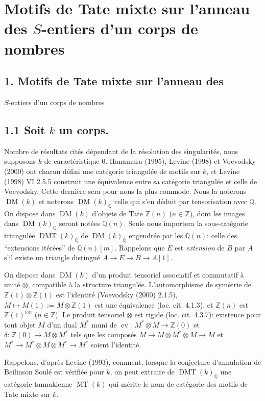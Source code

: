 \documentclass[11pt,a4paper]{article}
\theoremstyle{plain}
\theoremstyle{definition}
\theoremstyle{remark}
\DeclareMathOperator{\MT}{MT}
\DeclareMathOperator{\DM}{DM}
\DeclareMathOperator{\DMT}{DMT}
\DeclareMathOperator{\ev}{ev}
\newcommand{\dbQ}{\mathbb{Q}}
\newcommand{\dbZ}{\mathbb{Z}}
\begin{document}
\section{Motifs de Tate mixte sur l'anneau des $S$-entiers d'un corps de nombres}


\clearpage


\subsection*{1. Motifs de Tate mixte sur l'anneau des}
$S$-entiers d'un corps de nombres


\subsection*{1.1 Soit $k$ un corps.}
Nombre de r\'esultats cit\'es d\'ependant de
la r\'esolution des singularit\'es, nous
supposons $k$ de caract\'eristique $0$.
Hanamura (1995), Levine (1998) et Voevodsky
(2000) ont chacun d\'efini une cat\'egorie
triangul\'ee de motifs sur $k$, et Levine
(1998) VI 2.5.5 construit une \'equivalence
entre sa cat\'egorie triangul\'ee et celle de
Voevodsky.
Cette derni\`ere sera pour nous la plus
commode.
Nous la noterons $\DM(k)$ et noterons
$\DM(k)_{\dbQ}$ celle qui s'en d\'eduit par
tensorisation avec $\dbQ$.
On dispose dans $\DM(k)$ d'objets de Tate
$\dbZ(n)$ ($n\in\dbZ$), dont les images dans
$\DM(k)_{\dbQ}$ seront not\'ees $\dbQ(n)$.
Seule nous importera la sous-cat\'egorie
triangul\'ee $\DMT(k)_{\dbQ}$ de
$\DM(k)_{\dbQ}$ engendr\'ee par les $\dbQ(n)$:
celle des ``extensions it\'er\'ees'' de
$\dbQ(n)[m]$.
Rappelons que $E$ est {\it extension} de $B$
par $A$ s'il existe un triangle distingu\'e
$A\to E\to B\to A[1]$.

On dispose dans $\DM(k)$ d'un produit
tensoriel associatif et commutatif \`a unit\'e
$\otimes$, compatible \`a la structure
triangul\'ee.
L'automorphisme de sym\'etrie de
$\dbZ(1)\otimes\dbZ(1)$ est l'identit\'e
(Voevodsky (2000) 2.1.5), $M\mapsto
M(1):=M\otimes \dbZ(1)$ est une \'equivalence
(loc. cit. 4.1.3), et $\dbZ(n)$ est
$\dbZ(1)^{\otimes n}$ ($n\in\dbZ$).
Le produit tensoriel $\otimes$ est rigide
(loc. cit. 4.3.7): existence pour tout objet
$M$ d'un dual $M^*$ muni de $\ev\colon\,
M^*\otimes M\to \dbZ(0)$ et $\delta\colon\,
\dbZ(0)\to M\otimes M^*$ tels que les compos\'es
$M\to M\otimes M^*\otimes M\to M$ et $M^*\to
M^*\otimes M\otimes M^*\to M^*$ soient l'identit\'e.

Rappelons, d'apr\`es Levine (1993), comment,
lorsque la conjecture d'annulation de
Beilinson Soul\'e est v\'erifi\'ee
pour $k$, on peut extraire de $\DMT(k)_{\dbQ}$
une cat\'egorie tannakienne $\MT(k)$ qui
m\'erite le nom de cat\'egorie des motifs de
Tate mixte sur $k$.
\end{document}
